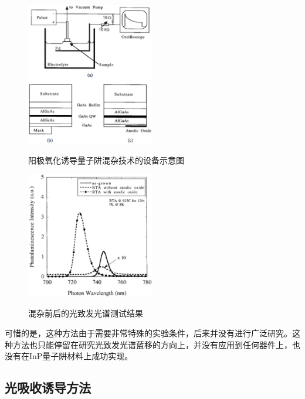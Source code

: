 \documentclass{ZJUthesis}
\begin{document}
\begin{figure}[htbp]
  \centering
  \includegraphics[width=0.5\textwidth]{./Pictures/oxide.eps}\\
  \caption{阳极氧化诱导量子阱混杂技术的设备示意图}
  \label{fig_oxide}
\end{figure}

\begin{figure}[htbp]
  \centering
  \includegraphics[width=0.5\textwidth]{./Pictures/oxide_pl.eps}\\
  \caption{混杂前后的光致发光谱测试结果}
  \label{fig_oxide_pl}
\end{figure}

可惜的是，这种方法由于需要非常特殊的实验条件，后来并没有进行广泛研究。这种方法也只能停留在研究光致发光谱蓝移的方向上，并没有应用到任何器件上，也没有在InP量子阱材料上成功实现。

\subsection{光吸收诱导方法}
\end{document}
